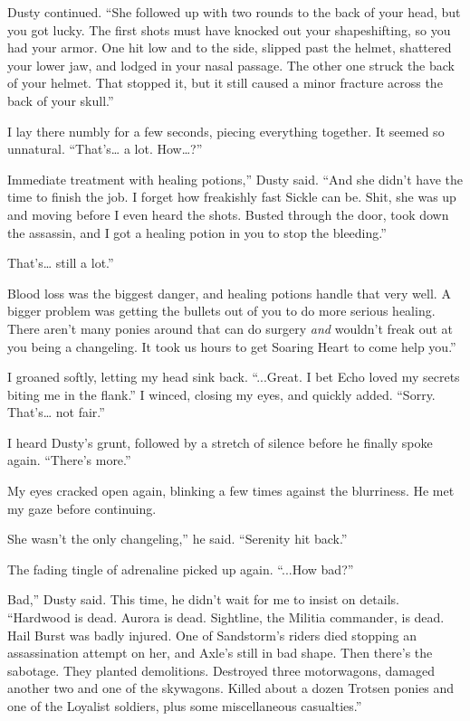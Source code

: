 Dusty continued. “She followed up with two rounds to the back of your head, but you got lucky. The first shots must have knocked out your shapeshifting, so you had your armor. One hit low and to the side, slipped past the helmet, shattered your lower jaw, and lodged in your nasal passage. The other one struck the back of your helmet. That stopped it, but it still caused a minor fracture across the back of your skull.”

I lay there numbly for a few seconds, piecing everything together. It seemed so unnatural. “That’s… a lot. How…?”

\leavevmode{}Immediate treatment with healing potions,” Dusty said. “And she didn’t have the time to finish the job. I forget how freakishly fast Sickle can be. Shit, she was up and moving before I even heard the shots. Busted through the door, took down the assassin, and I got a healing potion in you to stop the bleeding.”

\leavevmode{}That’s… still a lot.”

\leavevmode{}Blood loss was the biggest danger, and healing potions handle that very well. A bigger problem was getting the bullets out of you to do more serious healing. There aren’t many ponies around that can do surgery \textit{and} wouldn’t freak out at you being a changeling. It took us hours to get Soaring Heart to come help you.”

I groaned softly, letting my head sink back. “...Great. I bet Echo loved my secrets biting me in the flank.” I winced, closing my eyes, and quickly added. “Sorry. That’s… not fair.”

I heard Dusty’s grunt, followed by a stretch of silence before he finally spoke again. “There’s more.”

My eyes cracked open again, blinking a few times against the blurriness. He met my gaze before continuing.

\leavevmode{}She wasn’t the only changeling,” he said. “Serenity hit back.”

The fading tingle of adrenaline picked up again. “...How bad?”

\leavevmode{}Bad,” Dusty said. This time, he didn’t wait for me to insist on details. “Hardwood is dead. Aurora is dead. Sightline, the Militia commander, is dead. Hail Burst was badly injured. One of Sandstorm’s riders died stopping an assassination attempt on her, and Axle’s still in bad shape. Then there’s the sabotage. They planted demolitions. Destroyed three motorwagons, damaged another two and one of the skywagons. Killed about a dozen Trotsen ponies and one of the Loyalist soldiers, plus some miscellaneous casualties.”

